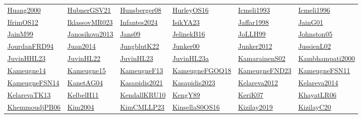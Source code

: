 \begin{longtable}{*{6}{l}}
\hyperref[detail:Huang2000]{Huang2000} & \hyperref[detail:HubnerGSV21]{HubnerGSV21} & \hyperref[detail:Hunsberger08]{Hunsberger08} & \hyperref[detail:HurleyOS16]{HurleyOS16} & \hyperref[detail:Icmeli1993]{Icmeli1993} & \hyperref[detail:Icmeli1996]{Icmeli1996}\\ 
\hyperref[detail:IfrimOS12]{IfrimOS12} & \hyperref[detail:IklassovMR023]{IklassovMR023} & \hyperref[detail:Infantes2024]{Infantes2024} & \hyperref[detail:IsikYA23]{IsikYA23} & \hyperref[detail:Jaffar1998]{Jaffar1998} & \hyperref[detail:JainG01]{JainG01}\\ 
\hyperref[detail:JainM99]{JainM99} & \hyperref[detail:Janosikova2013]{Janosikova2013} & \hyperref[detail:Jans09]{Jans09} & \hyperref[detail:JelinekB16]{JelinekB16} & \hyperref[detail:JoLLH99]{JoLLH99} & \hyperref[detail:Johnston05]{Johnston05}\\ 
\hyperref[detail:JourdanFRD94]{JourdanFRD94} & \hyperref[detail:Juan2014]{Juan2014} & \hyperref[detail:JungblutK22]{JungblutK22} & \hyperref[detail:Junker00]{Junker00} & \hyperref[detail:Junker2012]{Junker2012} & \hyperref[detail:JussienL02]{JussienL02}\\ 
\hyperref[detail:JuvinHHL23]{JuvinHHL23} & \hyperref[detail:JuvinHL22]{JuvinHL22} & \hyperref[detail:JuvinHL23]{JuvinHL23} & \hyperref[detail:JuvinHL23a]{JuvinHL23a} & \hyperref[detail:KamarainenS02]{KamarainenS02} & \hyperref[detail:Kambhampati2000]{Kambhampati2000}\\ 
\hyperref[detail:Kameugne14]{Kameugne14} & \hyperref[detail:Kameugne15]{Kameugne15} & \hyperref[detail:KameugneF13]{KameugneF13} & \hyperref[detail:KameugneFGOQ18]{KameugneFGOQ18} & \hyperref[detail:KameugneFND23]{KameugneFND23} & \hyperref[detail:KameugneFSN11]{KameugneFSN11}\\ 
\hyperref[detail:KameugneFSN14]{KameugneFSN14} & \hyperref[detail:KanetAG04]{KanetAG04} & \hyperref[detail:Kasapidis2021]{Kasapidis2021} & \hyperref[detail:Kasapidis2023]{Kasapidis2023} & \hyperref[detail:Kelareva2012]{Kelareva2012} & \hyperref[detail:Kelareva2014]{Kelareva2014}\\ 
\hyperref[detail:KelarevaTK13]{KelarevaTK13} & \hyperref[detail:KelbelH11]{KelbelH11} & \hyperref[detail:KendallKRU10]{KendallKRU10} & \hyperref[detail:KengY89]{KengY89} & \hyperref[detail:KeriK07]{KeriK07} & \hyperref[detail:KhayatLR06]{KhayatLR06}\\ 
\hyperref[detail:KhemmoudjPB06]{KhemmoudjPB06} & \hyperref[detail:Kim2004]{Kim2004} & \hyperref[detail:KimCMLLP23]{KimCMLLP23} & \hyperref[detail:KinsellaS0OS16]{KinsellaS0OS16} & \hyperref[detail:Kizilay2019]{Kizilay2019} & \hyperref[detail:KizilayC20]{KizilayC20}\\ 

\end{longtable}

